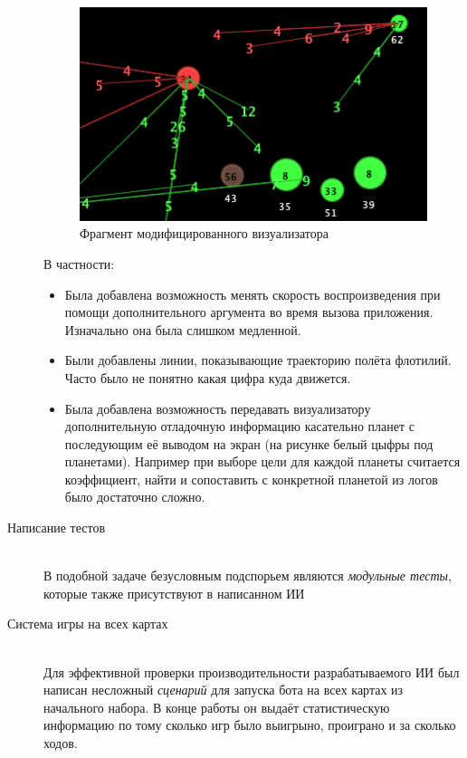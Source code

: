 \documentclass[12pt]{report}
\newenvironment{myItemize}{
	\begin{itemize}
  		\setlength{\itemsep}{1pt}
  		\setlength{\parskip}{0pt}
  		\setlength{\parsep}{0pt}
}{\end{itemize}}
\begin{document}
\begin{description}
\begin{figure}[h]
	\centering
	\includegraphics[scale=1]{modified_viz}
	\caption{Фрагмент модифицированного визуализатора}
	\label{fig:modif_viz}
\end{figure}
\pagebreak
В частности: 
	\begin{myItemize}
	\item Была добавлена возможность менять скорость воспроизведения при помощи дополнительного аргумента во время вызова приложения. Изначально она была слишком медленной.
	\item Были добавлены линии, показывающие траекторию полёта флотилий. Часто было не понятно какая цифра куда движется.
	\item Была добавлена возможность передавать визуализатору дополнительную отладочную информацию касательно планет с последующим её выводом на экран (на рисунке белый цыфры под планетами). Например при выборе цели для каждой планеты считается коэффициент, найти и сопоставить с конкретной планетой из логов было достаточно сложно.
	\end{myItemize}
\item[Написание тестов] \hfill \\ В подобной задаче безусловным подспорьем являются \emph{модульные тесты}, которые также присутствуют в написанном ИИ
\item[Система игры на всех картах] \hfill \\
Для эффективной проверки производительности разрабатываемого ИИ был написан несложный \emph{сценарий} для запуска бота на всех картах из начального набора. В конце работы он выдаёт статистическую информацию по тому сколько игр было выигрыно, проиграно и за сколько ходов.
\end{description}
\end{document}
